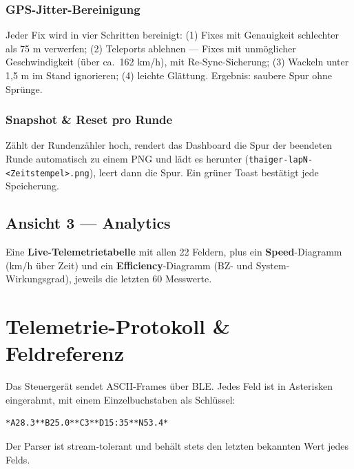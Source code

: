\documentclass[11pt,a4paper,oneside]{report}
\newcommand{\code}[1]{\texttt{#1}}
\begin{document}
\subsubsection{GPS-Jitter-Bereinigung}
Jeder Fix wird in vier Schritten bereinigt: (1) Fixes mit Genauigkeit schlechter
als 75 m verwerfen; (2) \glqq Teleports\grqq{} ablehnen --- Fixes mit unm\"oglicher
Geschwindigkeit (\"uber ca.\ 162 km/h), mit Re-Sync-Sicherung; (3) Wackeln unter
1,5 m im Stand ignorieren; (4) leichte Gl\"attung. Ergebnis: saubere Spur ohne
Spr\"unge.

\subsubsection{Snapshot \& Reset pro Runde}
Z\"ahlt der Rundenz\"ahler hoch, rendert das Dashboard die Spur der beendeten Runde
automatisch zu einem PNG und l\"adt es herunter
(\code{thaiger-lapN-<Zeitstempel>.png}), leert dann die Spur. Ein gr\"uner Toast
best\"atigt jede Speicherung.

\subsection{Ansicht 3 --- Analytics}
Eine \textbf{Live-Telemetrietabelle} mit allen 22 Feldern, plus ein
\textbf{Speed}-Diagramm (km/h \"uber Zeit) und ein \textbf{Efficiency}-Diagramm
(BZ- und System-Wirkungsgrad), jeweils die letzten 60 Messwerte.

\section{Telemetrie-Protokoll \& Feldreferenz}
Das Steuerger\"at sendet ASCII-Frames \"uber BLE. Jedes Feld ist in Asterisken
eingerahmt, mit einem Einzelbuchstaben als Schl\"ussel:

\begin{lstlisting}
*A28.3**B25.0**C3**D15:35**N53.4*
\end{lstlisting}
Der Parser ist stream-tolerant und beh\"alt stets den letzten bekannten Wert jedes
Felds.
\end{document}

